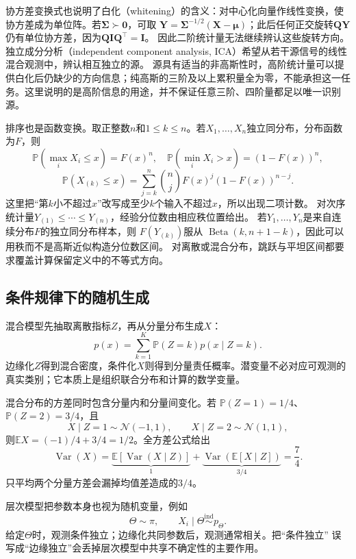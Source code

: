 协方差变换式也说明了白化（whitening）的含义：对中心化向量作线性变换，使协方差成为单位阵。若\(\bm\Sigma\succ\bm0\)，可取
\(\bm Y=\bm\Sigma^{-1/2}(\bm X-\bm\mu)\)；此后任何正交旋转\(\bm Q\bm Y\)仍有单位协方差，因为\(\bm Q\bm I\bm Q^\top=\bm I\)。
因此二阶统计量无法继续辨认这些旋转方向。独立成分分析（independent component analysis, ICA）希望从若干源信号的线性混合观测中，辨认相互独立的源。
源具有适当的非高斯性时，高阶统计量可以提供白化后仍缺少的方向信息；纯高斯的三阶及以上累积量全为零，不能承担这一任务。这里说明的是高阶信息的用途，并不保证任意三阶、四阶量都足以唯一识别源。

排序也是函数变换。取正整数\(n\)和\(1\leq k\leq n\)。若\(X_1,\ldots,X_n\)独立同分布，分布函数为\(F\)，则
\[
\mathbb P(\max_iX_i\leq x)=F(x)^n,\quad
\mathbb P(\min_iX_i>x)=(1-F(x))^n,
\]
\[
\mathbb P(X_{(k)}\leq x)
=\sum_{j=k}^n\binom njF(x)^j(1-F(x))^{n-j}.
\]
这里把“第\(k\)小不超过\(x\)”改写成至少\(k\)个输入不超过\(x\)，所以出现二项计数。
对次序统计量\(Y_{(1)}\leq\cdots\leq Y_{(n)}\)，经验分位数由相应秩位置给出。
若\(Y_1,\ldots,Y_n\)是来自连续分布\(F\)的独立同分布样本，则
\(F(Y_{(k)})\)服从
\(\operatorname{Beta}(k,n+1-k)\)，因此可以用秩而不是高斯近似构造分位数区间。
对离散或混合分布，跳跃与平坦区间都要求覆盖计算保留定义中的不等式方向。

\subsection{条件规律下的随机生成}
\label{sec:rv-random-generation}
混合模型先抽取离散指标\(Z\)，再从分量分布生成\(X\)：
\[ p(x)=\sum_{k=1}^{K}\mathbb{P}(Z=k)p(x\mid Z=k). \]
边缘化\(Z\)得到混合密度，条件化\(X\)则得到分量责任概率。潜变量不必对应可观测的真实类别；它本质上是组织联合分布和计算的数学变量。

混合分布的方差同时包含分量内和分量间变化。若
\(\mathbb{P}(Z=1)=1/4\)、\(\mathbb{P}(Z=2)=3/4\)，且
\[
  X\mid Z=1\sim\mathcal{N}(-1,1),\qquad
  X\mid Z=2\sim\mathcal{N}(1,1),
\]
则\(\mathbb{E}X=(-1)/4+3/4=1/2\)。全方差公式给出
\[
  \operatorname{Var}(X)
  =\underbrace{\mathbb{E}[\operatorname{Var}(X\mid Z)]}_{1}
   +\underbrace{\operatorname{Var}(\mathbb{E}[X\mid Z])}_{3/4}
  =\frac74.
\]
只平均两个分量方差会漏掉均值差造成的\(3/4\)。

层次模型把参数本身也视为随机变量，例如
\[ \Theta\sim\pi,\qquad
  X_i\mid\Theta\mathrel{\overset{\mathrm{ind}}{\sim}}p_\Theta. \]
给定\(\Theta\)时，观测条件独立；边缘化共同参数后，观测通常相关。把“条件独立”
误写成“边缘独立”会丢掉层次模型中共享不确定性的主要作用。

